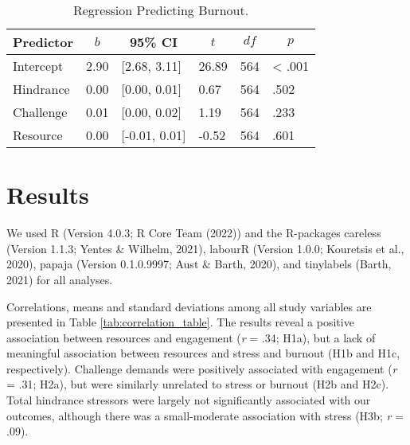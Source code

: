 \documentclass[
  man]{apa6}
\begin{document}
\begin{table}[tbp]

\begin{center}
\begin{threeparttable}

\caption{\label{tab:regression_table_bur}Regression Predicting Burnout.}

\begin{tabular}{llllll}
\toprule
Predictor & \multicolumn{1}{c}{$b$} & \multicolumn{1}{c}{95\% CI} & \multicolumn{1}{c}{$t$} & \multicolumn{1}{c}{$\mathit{df}$} & \multicolumn{1}{c}{$p$}\\
\midrule
Intercept & 2.90 & {}[2.68, 3.11] & 26.89 & 564 & < .001\\
Hindrance & 0.00 & {}[0.00, 0.01] & 0.67 & 564 & .502\\
Challenge & 0.01 & {}[0.00, 0.02] & 1.19 & 564 & .233\\
Resource & 0.00 & {}[-0.01, 0.01] & -0.52 & 564 & .601\\
\bottomrule
\end{tabular}

\end{threeparttable}
\end{center}

\end{table}

\hypertarget{results}{%
\section{Results}\label{results}}

We used R (Version 4.0.3; R Core Team (2022)) and the R-packages careless (Version 1.1.3; Yentes \& Wilhelm, 2021), labourR (Version 1.0.0; Kouretsis et al., 2020), papaja (Version 0.1.0.9997; Aust \& Barth, 2020), and tinylabels (Barth, 2021) for all analyses.

Correlations, means and standard deviations among all study variables are presented in Table \ref{tab:correlation_table}. The results reveal a positive association between resources and engagement (\emph{r} = .34; H1a), but a lack of meaningful association between resources and stress and burnout (H1b and H1c, respectively). Challenge demands were positively associated with engagement (\emph{r} = .31; H2a), but were similarly unrelated to stress or burnout (H2b and H2c). Total hindrance stressors were largely not significantly associated with our outcomes, although there was a small-moderate association with stress (H3b; \emph{r} = .09).
\end{document}
